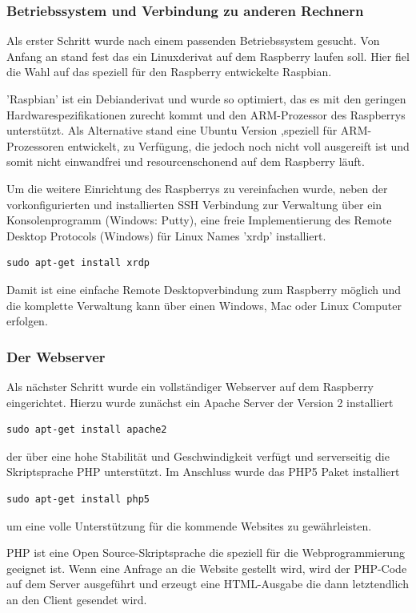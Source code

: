 \documentclass[11pt,a4paper]{article} %
\begin{document}
\subsubsection{Betriebssystem und Verbindung zu anderen Rechnern}
Als erster Schritt wurde nach einem passenden Betriebssystem gesucht. Von Anfang an stand fest das ein Linuxderivat auf dem Raspberry laufen soll. Hier fiel die Wahl auf das speziell für den Raspberry entwickelte Raspbian.
\par
'Raspbian' ist ein Debianderivat und wurde so optimiert, das es mit den geringen Hardwarespezifikationen zurecht kommt und den ARM-Prozessor des Raspberrys unterstützt. Als Alternative stand eine Ubuntu Version ,speziell für ARM-Prozessoren entwickelt, zu Verfügung, die jedoch noch nicht voll ausgereift ist und somit nicht einwandfrei und resourcenschonend auf dem Raspberry läuft.
\par
 Um die weitere Einrichtung des Raspberrys zu vereinfachen wurde, neben der vorkonfigurierten und installierten SSH Verbindung zur Verwaltung über ein Konsolenprogramm (Windows: Putty), eine freie Implementierung des Remote Desktop Protocols (Windows) für Linux Names 'xrdp' installiert. \cite{1}
\begin{frame}

\begin{lstlisting}
sudo apt-get install xrdp
\end{lstlisting}

\end{frame}
Damit ist eine einfache Remote Desktopverbindung zum Raspberry möglich und die komplette Verwaltung kann über einen Windows, Mac oder Linux Computer erfolgen. 
\par
\subsubsection{Der Webserver}
Als n\"achster Schritt wurde ein vollständiger Webserver auf dem Raspberry eingerichtet. Hierzu wurde zunächst ein Apache Server der Version 2 installiert
\begin{frame}

\begin{lstlisting}
sudo apt-get install apache2
\end{lstlisting}

\end{frame}
 der über eine hohe Stabilität und Geschwindigkeit verfügt und serverseitig die Skriptsprache PHP unterstützt. Im Anschluss wurde das PHP5 Paket installiert
 \begin{frame}

\begin{lstlisting}
sudo apt-get install php5
\end{lstlisting}

\end{frame}
 um eine volle Unterstützung für die kommende Websites zu gewährleisten.
 \cite{2}
 \par
 PHP ist eine Open Source-Skriptsprache die speziell für die Webprogrammierung geeignet ist. Wenn eine Anfrage an die Website gestellt wird, wird der PHP-Code auf dem Server ausgeführt und erzeugt eine HTML-Ausgabe die dann letztendlich an den Client gesendet wird.
 \cite{3}
\par
\end{document}
